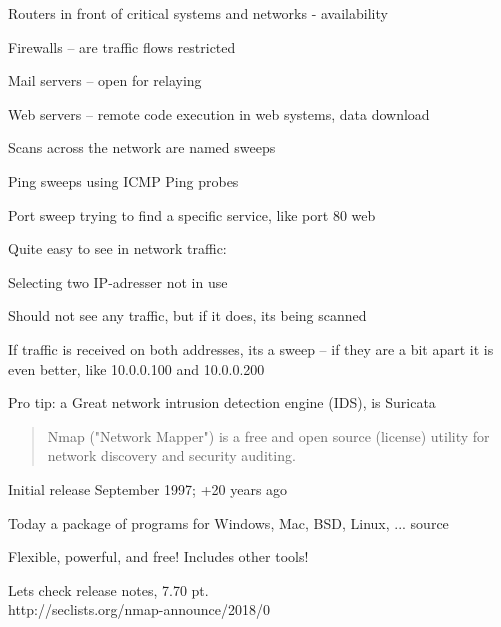 \documentclass[Screen16to9,17pt]{foils}
\begin{document}

\begin{list2}
\item Routers in front of critical systems and networks - availability
\item Firewalls -- are traffic flows restricted
\item Mail servers -- open for relaying
\item Web servers -- remote code execution in web systems, data download
\end{list2}


\begin{list1}
\item Scans across the network are named sweeps
\item Ping sweeps using ICMP Ping probes
\item Port sweep trying to find a specific service, like port 80 web
\item Quite easy to see in network traffic:
\begin{list2}
\item Selecting two IP-adresser not in use
\item Should not see any traffic, but if it does, its being scanned
\item If traffic is received on both addresses, its a sweep -- if they are a bit apart it is even better, like 10.0.0.100 and 10.0.0.200
  \end{list2}

\vskip 2cm
Pro tip: a Great network intrusion detection engine (IDS), is Suricata 
\end{list1}

\begin{quote}
Nmap ("Network Mapper") is a free and open source (license) utility for network discovery and security auditing.
\end{quote}

\begin{list1}
\item Initial release September 1997; +20 years ago
\item Today a package of programs for Windows, Mac, BSD, Linux, ... source
\item Flexible, powerful, and free! Includes other tools!
\item Lets check release notes, 7.70 pt.\\
http://seclists.org/nmap-announce/2018/0
\end{list1}
\end{document}
